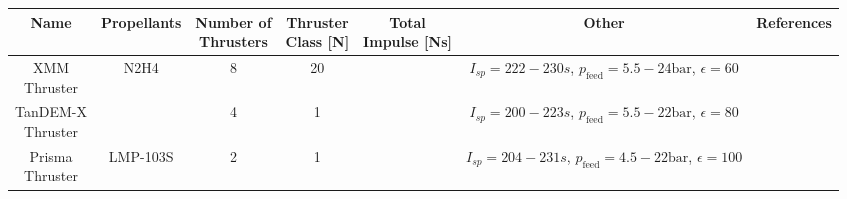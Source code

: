 \documentclass[12pt]{article}
\begin{document}
\newpage
\begin{adjustbox}{angle=90, center,caption={Overview of small propulsion systems using monopropellants.},float=table}
	\begin{tabular}{|c|c|c|c|c|c|c|}
		\hline
		Name & Propellants & \makecell{Number of\\Thrusters} & \makecell{Thruster\\Class {[}N{]}} & \makecell{Total\\Impulse [Ns]} & Other & References\\ \hline
		
		\makecell{XMM\\Thruster} & N2H4 & 8 & 20 & \makecell{$>517000$}  & \makecell{$I_{sp}=222-230s$,\\$p_{\text{feed}}=5.5-24\text{bar}$,\\$\epsilon=60$} & \makecell{ \cite{EsaXMM} \cite{ariane20N}} \\ \hline
		
		\makecell{TanDEM-X\\Thruster} & \makecell{N2H4} & 4 & 1 & \makecell{$>135000$}& \makecell{$I_{sp}=200-223s$,\\$p_{\text{feed}}=5.5-22\text{bar}$,\\$\epsilon=80$\\} & \makecell{\cite{tandemX} \cite{ariane1N}}\\ \hline
		
		\makecell{Prisma\\Thruster}& LMP-103S & 2 & 1 & \makecell{$\approx 108773$} & \makecell{$I_{sp}=204-231s$,\\$p_{\text{feed}}=4.5-22\text{bar}$,\\$\epsilon=100$} & \cite{hpgpThruster} \\ \hline
	\end{tabular}
	\label{tab:reference}
\end{adjustbox}

\newpage
\printbibliography 
 
\end{document}
